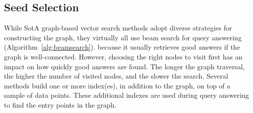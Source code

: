 
\subsection{Seed Selection}
\label{sec:ss}
While SotA graph-based vector search methods adopt diverse strategies for constructing the graph, they virtually all use beam search for query answering (Algorithm~\ref{alg:beamsearch}).
because it usually retrieves good answers if the graph is well-connected. However, choosing the right nodes to visit first has an impact on how quickly good answers are found. The longer the graph traversal, the higher the number of visited nodes, and the slower the search.
Several methods build one or more index(es), in addition to the graph, on top of a sample of data points. These additional indexes are used during query answering to find the entry points in the graph.
